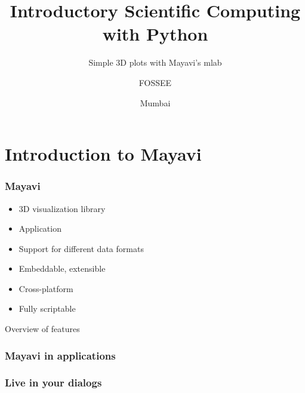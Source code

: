 \documentclass[14pt,compress]{beamer}
\title[Mayavi mlab]{Introductory Scientific Computing with
Python}
\subtitle{Simple 3D plots with Mayavi's mlab}
\author[Prabhu] {FOSSEE}
\institute[FOSSEE -- IITB] {Department of Aerospace Engineering\\IIT Bombay}
\date[] {
Mumbai
}
\begin{document}
\begin{frame}
  \maketitle
\end{frame}

\section{Introduction to Mayavi}

\begin{frame}
  \frametitle{Mayavi}
  \begin{itemize}
  \item 3D visualization library
  \item Application
  \item Support for different data formats
  \item Embeddable, extensible
  \item Cross-platform
  \item Fully scriptable
  \end{itemize}
\end{frame}

\begin{frame}
    {Overview of features}
      \vspace*{-0.3in}
  \begin{center}
    \hspace*{-0.2in}
  \end{center}
\end{frame}


\begin{frame}
    \frametitle{Mayavi in applications}
      \vspace*{-0.3in}
  \begin{center}
    \hspace*{-0.2in}
  \end{center}
\end{frame}

\begin{frame}
    \frametitle{Live in your dialogs}
      \vspace*{0.1in}
  \begin{center}
    \hspace*{-0.2in}
  \end{center}
\end{frame}
\end{document}
